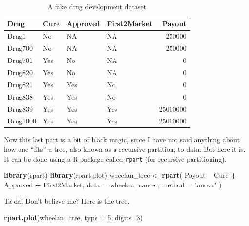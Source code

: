 \documentclass[openany]{book}
\newenvironment{Shaded}{\begin{snugshade}}{\end{snugshade}}
\newcommand{\DataTypeTok}[1]{\textcolor[rgb]{0.13,0.29,0.53}{#1}}
\newcommand{\DecValTok}[1]{\textcolor[rgb]{0.00,0.00,0.81}{#1}}
\newcommand{\KeywordTok}[1]{\textcolor[rgb]{0.13,0.29,0.53}{\textbf{#1}}}
\newcommand{\NormalTok}[1]{#1}
\newcommand{\OperatorTok}[1]{\textcolor[rgb]{0.81,0.36,0.00}{\textbf{#1}}}
\newcommand{\StringTok}[1]{\textcolor[rgb]{0.31,0.60,0.02}{#1}}
\begin{document}
\begin{table}[!h]

\caption{\label{tab:unnamed-chunk-26}A fake drug development dataset}
\centering
\begin{tabular}[t]{llllr}
\toprule
Drug & Cure & Approved & First2Market & Payout\\
\midrule
Drug1 & No & NA & NA & 250000\\
Drug700 & No & NA & NA & 250000\\
Drug701 & Yes & No & NA & 0\\
Drug820 & Yes & No & NA & 0\\
Drug821 & Yes & Yes & No & 0\\
\addlinespace
Drug838 & Yes & Yes & No & 0\\
Drug839 & Yes & Yes & Yes & 25000000\\
Drug1000 & Yes & Yes & Yes & 25000000\\
\bottomrule
\end{tabular}
\end{table}

Now this last part is a bit of black magic, since I have not said anything about how one ``fits'' a tree, also known as a recursive partition, to data. But here it is. It can be done using a R package called \texttt{rpart} (for recursive partitioning).

\begin{Shaded}
\begin{Highlighting}[]
\KeywordTok{library}\NormalTok{(rpart)}
\KeywordTok{library}\NormalTok{(rpart.plot)}
\NormalTok{wheelan_tree <-}\StringTok{ }\KeywordTok{rpart}\NormalTok{(}
\NormalTok{  Payout }\OperatorTok{~}\StringTok{ }\NormalTok{Cure }\OperatorTok{+}\StringTok{ }\NormalTok{Approved }\OperatorTok{+}\StringTok{ }\NormalTok{First2Market, }
  \DataTypeTok{data =}\NormalTok{ wheelan_cancer, }
  \DataTypeTok{method =} \StringTok{"anova"}
\NormalTok{)}
\end{Highlighting}
\end{Shaded}

Ta-da! Don't believe me? Here is the tree.

\begin{Shaded}
\begin{Highlighting}[]
\KeywordTok{rpart.plot}\NormalTok{(wheelan_tree, }\DataTypeTok{type =} \DecValTok{5}\NormalTok{, }\DataTypeTok{digits=}\DecValTok{3}\NormalTok{)}
\end{Highlighting}
\end{Shaded}
\end{document}
